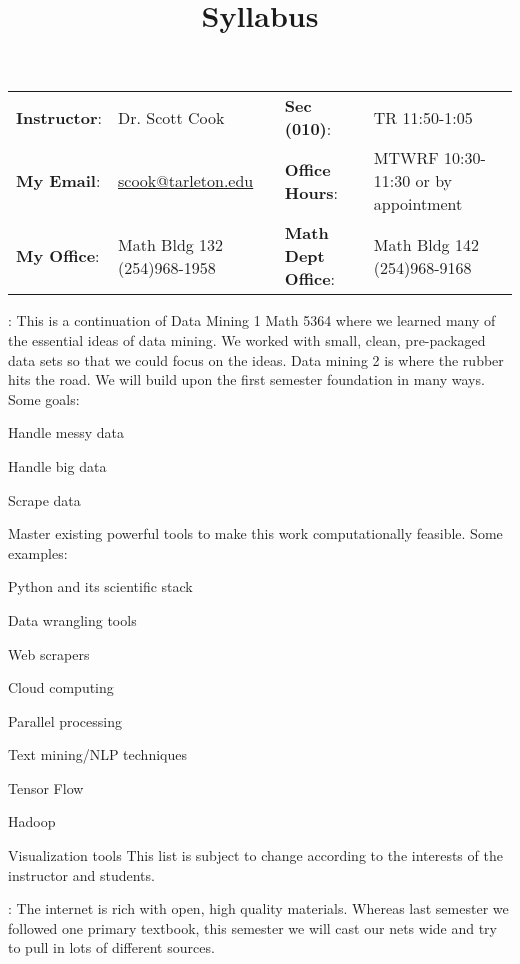 \documentclass[letterpaper]{article}
\title{Syllabus}
\begin{document}
\begin{center}
\vspace{-18\lineskip}
\begin{tabular}{ll||ll}
\textbf{Instructor}:        & Dr. Scott Cook                                        & \textbf{Sec (010)}:     & TR 11:50-1:05\\
\textbf{My Email}:          & \href{mailto:scook@tarleton.edu}{scook@tarleton.edu}  & \textbf{Office Hours}:  & MTWRF 10:30-11:30 or by appointment\\
\textbf{My Office}:         & Math Bldg 132 (254)968-1958                           & \textbf{Math Dept Office}:  & Math Bldg 142 (254)968-9168\\
\end{tabular}
\hhrule
\end{center}

: This is a continuation of Data Mining 1 Math 5364 where we learned many of the essential ideas of data mining.  We worked with small, clean, pre-packaged data sets so that we could focus on the ideas.  Data mining 2 is where the rubber hits the road.  We will build upon the first semester foundation in many ways.  Some goals:
\bit
	\item Handle messy data
	\item Handle big data
	\item Scrape data
	\item Master existing powerful tools to make this work computationally feasible.  Some examples:
	\bit
		\item Python and its scientific stack
		\item Data wrangling tools 
		\item Web scrapers
		\item Cloud computing
		\item Parallel processing
		\item Text mining/NLP techniques		
		\item Tensor Flow		
		\item Hadoop
		\item Visualization tools
	\eit
\eit
This list is subject to change according to the interests of the instructor and students.

\bu[Materials]: The internet is rich with open, high quality materials.  Whereas last semester we followed one primary textbook, this semester we will cast our nets wide and try to pull in lots of different sources.
\end{document}
